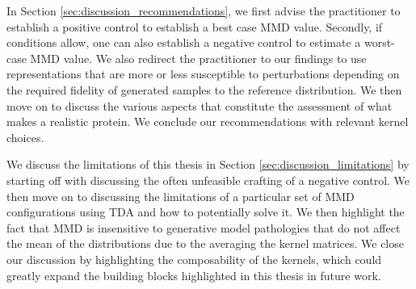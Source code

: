 In Section \ref{sec:discussion_recommendations}, we first advise the
practitioner to establish a positive control to establish a best case MMD value.
Secondly, if conditions allow, one can also establish a negative control to
estimate a worst-case MMD value. We also redirect the practitioner to our
findings to use representations that are more or less susceptible to
perturbations depending on the required fidelity of generated samples to the
reference distribution. We then move on to discuss the various aspects that
constitute the assessment of what makes a realistic protein. We conclude our
recommendations with relevant kernel choices.

We discuss the limitations of this thesis in Section
\ref{sec:discussion_limitations} by starting off with discussing the often
unfeasible crafting of a negative control. We then move on to discussing the
limitations of a particular set of MMD configurations using TDA and how to
potentially solve it. We then highlight the fact that MMD is insensitive to
generative model pathologies that do not affect the mean of the distributions
due to the averaging the kernel matrices. We close our discussion by
highlighting the composability of the kernels, which could greatly expand the
building blocks highlighted in this thesis in future work.
